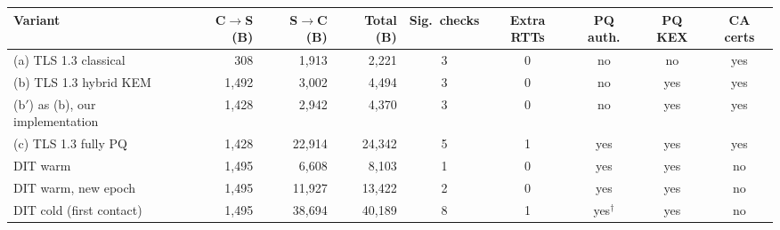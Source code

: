 \begin{tabular}{lrrrccccc}
\toprule
Variant & C$\to$S (B) & S$\to$C (B) & Total (B) & Sig.\ checks & Extra RTTs & PQ auth. & PQ KEX & CA certs \\
\midrule
(a) TLS 1.3 classical & 308 & 1{,}913 & 2{,}221 & 3 & 0 & no & no & yes \\
(b) TLS 1.3 hybrid KEM & 1{,}492 & 3{,}002 & 4{,}494 & 3 & 0 & no & yes & yes \\
(b$'$) as (b), our implementation & 1{,}428 & 2{,}942 & 4{,}370 & 3 & 0 & no & yes & yes \\
(c) TLS 1.3 fully PQ & 1{,}428 & 22{,}914 & 24{,}342 & 5 & 1 & yes & yes & yes \\
DIT warm & 1{,}495 & 6{,}608 & 8{,}103 & 1 & 0 & yes & yes & no \\
DIT warm, new epoch & 1{,}495 & 11{,}927 & 13{,}422 & 2 & 0 & yes & yes & no \\
DIT cold (first contact) & 1{,}495 & 38{,}694 & 40{,}189 & 8 & 1 & yes$^\dagger$ & yes & no \\
\bottomrule
\end{tabular}
